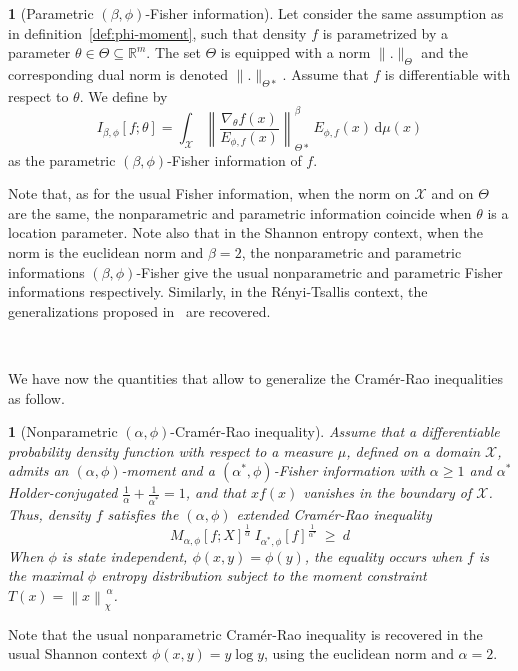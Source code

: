 \documentclass[english,sort&compress]{elsarticle}
\theoremstyle{definition}
\newtheorem{defn}{\protect\definitionname}
\theoremstyle{plain}
\newtheorem{prop}{\protect\propositionname}
\theoremstyle{plain}
\providecommand{\definitionname}{Definition}
\providecommand{\propositionname}{Proposition}
\def\dmu{\mathrm{d}\mu}
\def\Rset{\mathbb{R}}
\def\X{\mathcal{X}}
\begin{document}
\begin{defn}[Parametric $(\beta,\phi)$-Fisher information]\label{def:p-phi-Fisher}
  Let consider  the same assumption as  in definition~\ref{def:phi-moment}, such
  that density $f$  is parametrized by a parameter  $\theta \in \Theta \subseteq
  \Rset^m$.  The set  $\Theta$ is equipped with a  norm $\|.\|_{\Theta}$ and the
  corresponding  dual norm  is denoted  $\|.\|_{\Theta*}$.  Assume  that  $f$ is
  differentiable with respect to $\theta$. We define by
  \begin{equation}\label{eq:p-phi-Fisher}
  I_{\beta,\phi}[f;\theta] = \int_\X \left\| \frac{\nabla_\theta
  f(x)}{E_{\phi,f}(x)} \right\|_{\Theta*}^\beta \, E_{\phi,f}(x) \, \dmu(x)
  \end{equation}
  as the parametric $(\beta,\phi)$-Fisher information of $f$.
\end{defn}
%
Note that,  as for the usual  Fisher information, when  the norm on $\X$  and on
$\Theta$  are the same,  the nonparametric  and parametric  information coincide
when $\theta$  is a location  parameter. Note also  that in the  Shannon entropy
context, when the norm is the  euclidean norm and $\beta = 2$, the nonparametric
and parametric  informations $(\beta,\phi)$-Fisher give  the usual nonparametric
and   parametric   Fisher   informations   respectively.   Similarly,   in   the
R\'enyi-Tsallis context, the  generalizations proposed in~\cite{Vaj73, LutYan05,
  LutLv12, JohVig07, Ber12:06_1, Ber12:06_2, Ber13} are recovered.

\

We  have  now   the  quantities  that  allow  to   generalize  the  Cram\'er-Rao
inequalities as follow.
%
\begin{prop}[Nonparametric                           $(\alpha,\phi)$-Cram\'er-Rao
  inequality]\label{prop:np-phi-CR}
  Assume that  a differentiable probability  density function with respect  to a
  measure $\mu$, defined on a  domain $\X$, admits an $(\alpha,\phi)$-moment and
  a  $(\alpha^*,\phi)$-Fisher information  with  $\alpha \ge  1$ and  $\alpha^*$
  Holder-conjugated  $\frac{1}{\alpha} +  \frac{1}{\alpha^*} =  1$, and  that $x
  f(x)$  vanishes in  the boundary  of $\X$.   Thus, density  $f$  satisfies the
  $(\alpha,\phi)$ extended Cram\'er-Rao inequality
  \begin{equation}\label{eq:np-phi-CR}
   M_{\alpha,\phi}[f;X]^{\frac{1}{\alpha}} \: I_{\alpha^*\!,\phi}[f]^{\frac{1}{\alpha^*}}
   \: \ge \: d
  \end{equation}
  When $\phi$ is  state independent, $\phi(x,y) = \phi(y)$,  the equality occurs
  when  $f$ is the  maximal $\phi$  entropy distribution  subject to  the moment
  constraint $T(x) = \left\| x \right\|_{\chi}^{\, \alpha}$.
\end{prop}
%
Note that  the usual nonparametric  Cram\'er-Rao inequality is recovered  in the
usual Shannon  context $\phi(x,y)  = y  \log y$, using  the euclidean  norm and
$\alpha = 2$.
\end{document}
